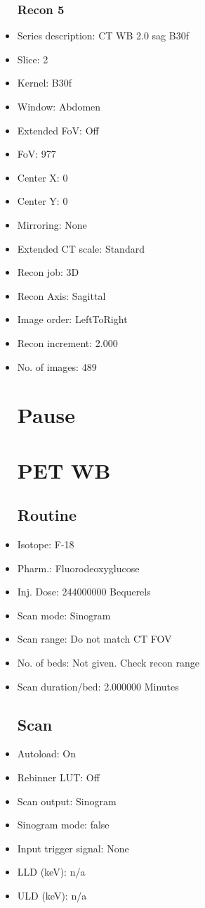 \documentclass[12pt]{article}
\begin{document}
\begin{itemize}
\subsubsection{Recon 5}
\item Series description: CT WB 2.0 sag B30f
\item Slice: 2
\item Kernel: B30f
\item Window: Abdomen
\item Extended FoV: Off
\item FoV: 977
\item Center X: 0
\item Center Y: 0
\item Mirroring: None
\item Extended CT scale: Standard
\item Recon job: 3D
\item Recon Axis: Sagittal
\item Image order: LeftToRight
\item Recon increment: 2.000
\item No. of images: 489
\section{Pause}
\section{PET WB}\subsection{Routine}
\item Isotope: F-18
\item Pharm.: Fluorodeoxyglucose
\item Inj. Dose: 244000000 Bequerels
\item Scan mode: Sinogram
\item Scan range: Do not match CT FOV
\item No. of beds: Not given. Check recon range
\item Scan duration/bed: 2.000000 Minutes
\subsection{Scan}
\item Autoload: On
\item Rebinner LUT: Off
\item Scan output: Sinogram
\item Sinogram mode: false
\item Input trigger signal: None
\item LLD (keV): n/a
\item ULD (keV): n/a

\end{itemize}
\end{document}
